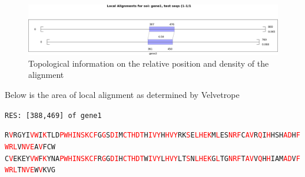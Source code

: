 \documentclass[phd,tocprelim]{cornell}
\begin{document}
\pagebreak

\begin{figure}[hpt]
	\centering
		\includegraphics[width=1.0\textwidth]{figures/velvetrope/hmm1_2.png}
        \caption[Topological information of NW HMM test]{Topological information on the relative position and density of the alignment}
	\label{fig:06}
\end{figure}

Below is the area of local alignment as determined by Velvetrope

\begin{flushleft}
    \singlespacing
\footnotesize 
\texttt{RES: [388,469] of gene1}           

\texttt{R\textcolor{red}{V}RGYI\textcolor{red}{V}\textcolor{red}{W}I\textcolor{red}{K}TLD\textcolor{red}{P}\textcolor{red}{W}\textcolor{red}{H}\textcolor{red}{I}\textcolor{red}{N}\textcolor{red}{S}\textcolor{red}{K}\textcolor{red}{C}\textcolor{red}{F}G\textcolor{red}{G}S\textcolor{red}{D}\textcolor{red}{I}M\textcolor{red}{C}\textcolor{red}{T}\textcolor{red}{H}\textcolor{red}{D}\textcolor{red}{T}H\textcolor{red}{I}\textcolor{red}{V}\textcolor{red}{Y}H\textcolor{red}{H}\textcolor{red}{V}\textcolor{red}{Y}RK\textcolor{red}{S}E\textcolor{red}{L}\textcolor{red}{H}\textcolor{red}{E}\textcolor{red}{K}M\textcolor{red}{L}ES\textcolor{red}{N}\textcolor{red}{R}\textcolor{red}{F}C\textcolor{red}{A}\textcolor{red}{V}R\textcolor{red}{Q}I\textcolor{red}{H}HSH\textcolor{red}{A}\textcolor{red}{D}H\textcolor{red}{F}\textcolor{red}{W}\textcolor{red}{R}\textcolor{red}{L}V\textcolor{red}{N}\textcolor{red}{V}\textcolor{red}{E}A\textcolor{red}{V}FCW} \\
\texttt{C\textcolor{red}{V}EKEY\textcolor{red}{V}\textcolor{red}{W}F\textcolor{red}{K}YNA\textcolor{red}{P}\textcolor{red}{W}\textcolor{red}{H}\textcolor{red}{I}\textcolor{red}{N}\textcolor{red}{S}\textcolor{red}{K}\textcolor{red}{C}\textcolor{red}{F}R\textcolor{red}{G}G\textcolor{red}{D}\textcolor{red}{I}H\textcolor{red}{C}\textcolor{red}{T}\textcolor{red}{H}\textcolor{red}{D}\textcolor{red}{T}W\textcolor{red}{I}\textcolor{red}{V}\textcolor{red}{Y}L\textcolor{red}{H}\textcolor{red}{V}\textcolor{red}{Y}LT\textcolor{red}{S}N\textcolor{red}{L}\textcolor{red}{H}\textcolor{red}{E}\textcolor{red}{K}G\textcolor{red}{L}TG\textcolor{red}{N}\textcolor{red}{R}\textcolor{red}{F}T\textcolor{red}{A}\textcolor{red}{V}V\textcolor{red}{Q}H\textcolor{red}{H}IAM\textcolor{red}{A}\textcolor{red}{D}V\textcolor{red}{F}\textcolor{red}{W}\textcolor{red}{R}\textcolor{red}{L}T\textcolor{red}{N}\textcolor{red}{V}\textcolor{red}{E}W\textcolor{red}{V}KVG}


\end{flushleft}
\end{document}
